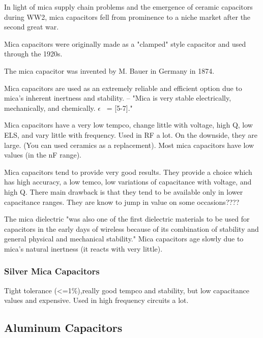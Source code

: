 In light of mica supply chain problems and the emergence of ceramic capacitors during WW2, mica capacitors fell from prominence to a niche market after the second great war.\cite[Ch 3, Sec II]{cerMaterials}

Mica capacitors were originally made as a "clamped" style capacitor and used through the 1920s\cite{wiki_mica}. 

The mica capacitor was invented by M. Bauer in Germany in 1874. 

Mica capacitors are used as an extremely reliable and efficient option due to mica's inherent inertness and stability. \cite{tedds_mica}    
--
"Mica is very stable electrically, mechanically, and chemically. $\epsilon$ ~= [5-7].\cite{uiowa_mica}"

Mica capacitors have a very low tempco, change little with voltage, high Q, low ELS, and vary little with frequency. Used in RF a lot. On the downside, they are large. (You can used ceramics as a replacement). Most mica capacitors have low values (in the nF range).\cite{uiowa_mica}

\nocite{hh_cap_table}
\nocite{capGuide_mica}

Mica capacitors tend to provide very good results. They provide a choice which has high accuracy, a low temco, low variations of capacitance with voltage, and high Q. There main drawback is that they tend to be available only in lower capacitance ranges. They are know to jump in value on some occasions???? 
\cite{radio_mica}

The mica dielectric "was also one of the first dielectric materials to be used for capacitors in the early days of wireless because of its combination of stability and general physical and mechanical stability." Mica capacitors age slowly due to mica's natural inertness (it reacts with very little).\cite{radio_mica}

\subsubsection{Silver Mica Capacitors}

Tight tolerance (<=1\%),really good tempco and stability, but low capacitance values and expensive. Used in high frequency circuits a lot.\cite{learn_caps}

\subsection{Aluminum Capacitors}

